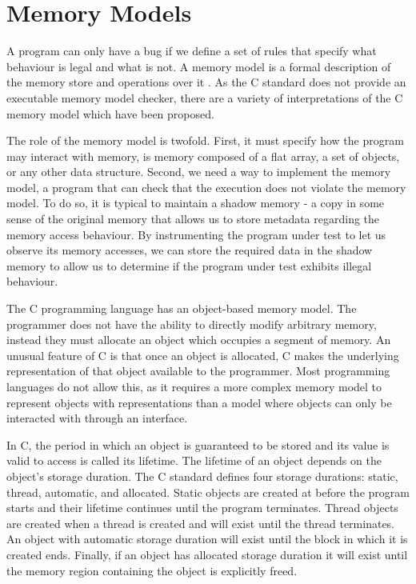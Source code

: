 \documentclass[12pt,twoside]{report}
\begin{document}
\section{Memory Models}
A program can only have a bug if we define a set of rules that specify what behaviour is legal and what is not. A memory model is a formal description of the memory store and operations over it \cite{leroy2008formal}. As the C standard does not provide an executable memory model checker, there are a variety of interpretations of the C memory model which have been proposed.

The role of the memory model is twofold. First, it must specify how the program may interact with memory, is memory composed of a flat array, a set of objects, or any other data structure. Second, we need a way to implement the memory model, a program that can check that the execution does not violate the memory model. To do so, it is typical to maintain a shadow memory - a copy in some sense of the original memory that allows us to store metadata regarding the memory access behaviour. By instrumenting the program under test to let us observe its memory accesses, we can store the required data in the shadow memory to allow us to determine if the program under test exhibits illegal behaviour.

The C programming language has an object-based memory model. The programmer does not have the ability to directly modify arbitrary memory, instead they must allocate an object which occupies a segment of memory. An unusual feature of C is that once an object is allocated, C makes the underlying representation of that object available to the programmer. Most programming languages do not allow this, as it requires a more complex memory model to represent objects with representations than a model where objects can only be interacted with through an interface. 

In C, the period in which an object is guaranteed to be stored and its value is valid to access is called its lifetime. The lifetime of an object depends on the object's storage duration. The C standard defines four storage durations: static, thread, automatic, and allocated. Static objects are created at before the program starts and their lifetime continues until the program terminates. Thread objects are created when a thread is created and will exist until the thread terminates. An object with automatic storage duration will exist until the block in which it is created ends. Finally, if an object has allocated storage duration it will exist until the memory region containing the object is explicitly freed.
\end{document}

